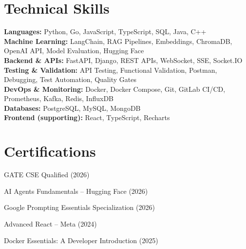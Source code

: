 \documentclass[letterpaper,11pt]{article}
\begin{document}
\section{Technical Skills}
\begin{itemize}[leftmargin=0.15in, label={}]
  \small{\item{
    \textbf{Languages:} Python, Go, JavaScript, TypeScript, SQL, Java, C++ \\
    \textbf{Machine Learning:} LangChain, RAG Pipelines, Embeddings, ChromaDB, OpenAI API, Model Evaluation, Hugging Face \\
    \textbf{Backend \& APIs:} FastAPI, Django, REST APIs, WebSocket, SSE, Socket.IO \\
    \textbf{Testing \& Validation:} API Testing, Functional Validation, Postman, Debugging, Test Automation, Quality Gates \\
    \textbf{DevOps \& Monitoring:} Docker, Docker Compose, Git, GitLab CI/CD, Prometheus, Kafka, Redis, InfluxDB \\
    \textbf{Databases:} PostgreSQL, MySQL, MongoDB \\
    \textbf{Frontend (supporting):} React, TypeScript, Recharts
  }}
\end{itemize}

\section{Certifications}
\begin{itemize}[leftmargin=0.15in, label={\textbullet}]
  \small{
    \item GATE CSE Qualified (2026)
    \item AI Agents Fundamentals -- Hugging Face (2026)
    \item Google Prompting Essentials Specialization (2026)
    \item Advanced React -- Meta (2024)
    \item Docker Essentials: A Developer Introduction (2025)
  }
\end{itemize}
\end{document}
